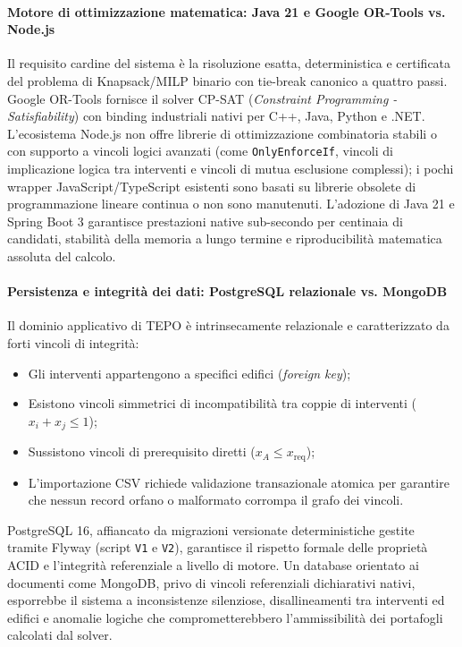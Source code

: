 \paragraph{Motore di ottimizzazione matematica: Java 21 e Google OR-Tools vs. Node.js}
Il requisito cardine del sistema è la risoluzione esatta, deterministica e certificata del problema di Knapsack/MILP binario con tie-break canonico a quattro passi. Google OR-Tools fornisce il solver CP-SAT (\emph{Constraint Programming - Satisfiability}) con binding industriali nativi per C++, Java, Python e .NET. L'ecosistema Node.js non offre librerie di ottimizzazione combinatoria stabili o con supporto a vincoli logici avanzati (come \texttt{OnlyEnforceIf}, vincoli di implicazione logica tra interventi e vincoli di mutua esclusione complessi); i pochi wrapper JavaScript/TypeScript esistenti sono basati su librerie obsolete di programmazione lineare continua o non sono manutenuti. L'adozione di Java 21 e Spring Boot 3 garantisce prestazioni native sub-secondo per centinaia di candidati, stabilità della memoria a lungo termine e riproducibilità matematica assoluta del calcolo.

\paragraph{Persistenza e integrità dei dati: PostgreSQL relazionale vs. MongoDB}
Il dominio applicativo di TEPO è intrinsecamente relazionale e caratterizzato da forti vincoli di integrità:
\begin{itemize}[leftmargin=1.4em, itemsep=0.25em]
    \item Gli interventi appartengono a specifici edifici (\emph{foreign key});
    \item Esistono vincoli simmetrici di incompatibilità tra coppie di interventi ($x_i + x_j \le 1$);
    \item Sussistono vincoli di prerequisito diretti ($x_A \le x_{\text{req}}$);
    \item L'importazione CSV richiede validazione transazionale atomica per garantire che nessun record orfano o malformato corrompa il grafo dei vincoli.
\end{itemize}
PostgreSQL 16, affiancato da migrazioni versionate deterministiche gestite tramite Flyway (script \texttt{V1} e \texttt{V2}), garantisce il rispetto formale delle proprietà ACID e l'integrità referenziale a livello di motore. Un database orientato ai documenti come MongoDB, privo di vincoli referenziali dichiarativi nativi, esporrebbe il sistema a inconsistenze silenziose, disallineamenti tra interventi ed edifici e anomalie logiche che comprometterebbero l'ammissibilità dei portafogli calcolati dal solver.

